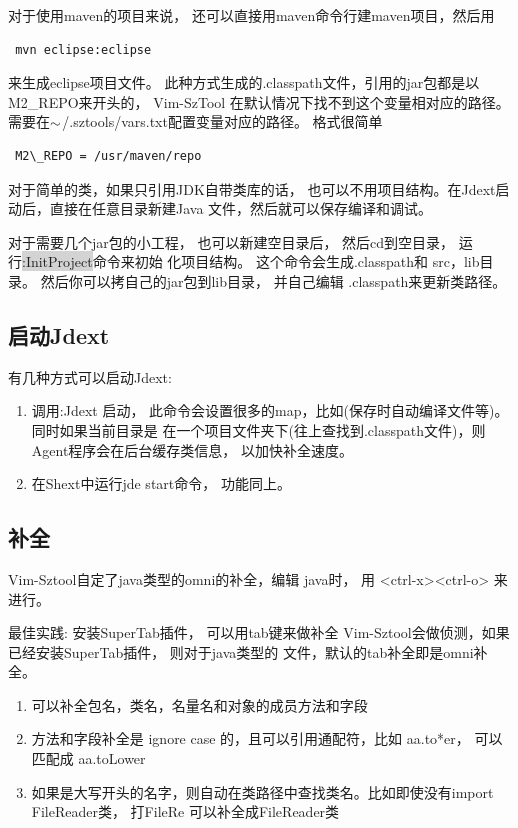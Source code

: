 \documentclass[oneside,openany]{book}
\begin{document}
   对于使用maven的项目来说， 还可以直接用maven命令行建maven项目，然后用
  \begin{verbatim} mvn eclipse:eclipse \end{verbatim}
  来生成eclipse项目文件。 此种方式生成的.classpath文件，引用的jar包都是以M2\_REPO来开头的， Vim-SzTool
在默认情况下找不到这个变量相对应的路径。 需要在$\tiny{\sim}$/.sztools/vars.txt配置变量对应的路径。 格式很简单
  \begin{verbatim} M2\_REPO = /usr/maven/repo \end{verbatim}

   对于简单的类，如果只引用JDK自带类库的话， 也可以不用项目结构。在Jdext启动后，直接在任意目录新建Java
文件，然后就可以保存编译和调试。
  
   对于需要几个jar包的小工程， 也可以新建空目录后， 然后cd到空目录， 运行\colorbox{lightgray}{:InitProject}命令来初始
化项目结构。 这个命令会生成.classpath和 src，lib目录。 然后你可以拷自己的jar包到lib目录， 并自己编辑
.classpath来更新类路径。

\subsection{启动Jdext}
   有几种方式可以启动Jdext:
    \begin{enumerate}
      \item 调用:Jdext 启动， 此命令会设置很多的map，比如(保存时自动编译文件等)。 同时如果当前目录是
  在一个项目文件夹下(往上查找到.classpath文件)，则Agent程序会在后台缓存类信息， 以加快补全速度。
      \item 在Shext中运行jde start命令， 功能同上。
    \end{enumerate}

\subsection{补全}
    Vim-Sztool自定了java类型的omni的补全，编辑 java时， 用 <ctrl-x><ctrl-o> 来进行。
    \begin{mdframed}[style=BestPracticeFrame]
      最佳实践: 安装SuperTab插件， 可以用tab键来做补全
      Vim-Sztool会做侦测，如果已经安装SuperTab插件， 则对于java类型的
      文件，默认的tab补全即是omni补全。
    \end{mdframed}

    \begin{enumerate}
      \item 可以补全包名，类名，名量名和对象的成员方法和字段
      \item 方法和字段补全是 ignore case 的，且可以引用通配符，比如 aa.to*er， 可以匹配成 aa.toLower
      \item 如果是大写开头的名字，则自动在类路径中查找类名。比如即使没有import FileReader类， 打FileRe 可以补全成FileReader类 
    \end{enumerate}
    
\end{document}
